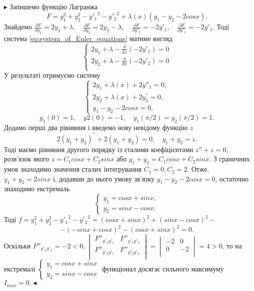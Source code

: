 \documentclass[12pt,a4paper]{article}
\begin{document}
	$\blacktriangleright$ Запишемо функцію Лагранжа
	$$F = y_1^2 + y_2^2 - {y'_1}^{2} - {y'_2}^{2} + \lambda(x)(y_1 - y_2 - 2cosx).$$
	Знайдемо $\frac{\partial F}{\partial y_1} = 2y_1 + \lambda, \quad
		\frac{\partial F}{\partial y_2} = 2y_2 - \lambda, \quad
		\frac{\partial F}{\partial y'_1} = -2y'_1, \quad
		\frac{\partial F}{\partial y'_2} = -2y'_1$. 
	Тоді система \eqref{eq:system_of_Euler_equations} матиме вигляд
	$$\begin{cases}
		2y_1 + \lambda - \frac{d}{dx}\left(-2y'_1\right) = 0 \\
		2y_2 + \lambda - \frac{d}{dx}\left(-2y'_2\right) = 0 \\
	\end{cases}$$
	У результаті отримуємо систему 
	$$\begin{cases}
		2y_1 + \lambda(x) + 2y''_1 = 0, \\
		2y_2 + \lambda(x) + 2y_2^{''} = 0, \\
		y_1 - y_2 - 2cosx = 0,
	\end{cases}$$
	$$y_1(0) = 1,\quad y2(0) = -1,\quad y_1(\pi/2) = y_2(\pi/2) = 1.$$
	Додамо перші два рівняння і введемо нову невідому функцію $z$
	$$2(y_1 + y_2)^{''} + 2(y_1 + y_2) = 0, \quad y_1 + y_2 = z.$$
	Тоді маємо рівняння другого порядку із сталими коефіцієнтами $z'' + z = 0$,
	розв’язок якого $z = C_1cosx + C_2sinx$ або $y_1 + y_2 = C_1cosx + C_2sinx$.
	З граничних умов  знаходимо значення сталих інтегрування $C_1 = 0, C_2 = 2$. Отже,
	$y_1 + y_2 = 2 sinx$ і, додавши до нього умову зв’язку $y_1 - y_2 - 2cosx = 0$, остаточно
	знаходимо екстремаль
	$$\begin{cases}
		y_1 = cosx + sinx,\\
		y_2 = sinx - cosx.
	\end{cases}$$
	Тоді $f = y_1^{2} + y_2^{2} - {y'_1}^{2} -{y'_2}^{2} = (cosx + sinx)^2 + (sinx - cosx)^2 - $ 
		$$-(-sinx + cosx)^2 - (cosx + sinx)^2 = 0.$$
	Оскільки $F''_{y'_1y'_1} = -2 < 0,
	\begin{vmatrix}
		F''_{y'_1y'_1} & F''_{y'_1y'_2} \\
		F''_{y'_2y'_1} & F''_{y'_2y'_2} \\
	\end{vmatrix} =
	\begin{vmatrix}
		-2 & 0 \\
		0 & -2 \\
	\end{vmatrix} = 4 > 0 $, то на екстремалі
	$\begin{cases}
		y_1 = cosx + sinx  \\
		y_2 = sinx - cosx
	\end{cases}$ функціонал досягає сильного максимуму $I_{max}= 0.\blacktriangleleft$
\end{document}
